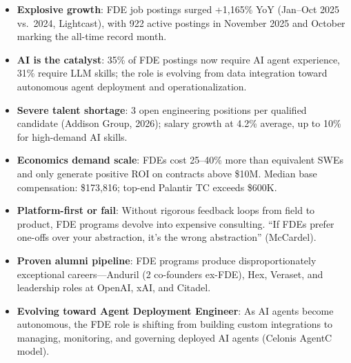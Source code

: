 \begin{tcolorbox}[
    colback=mslightgray, colframe=msblue,
    boxrule=1pt, arc=3pt,
    left=8pt, right=8pt, top=6pt, bottom=6pt,
    title={\textbf{Key Takeaways}}
]
\begin{itemize}
    \item \textbf{Explosive growth}: FDE job postings surged +1,165\%
        YoY (Jan--Oct 2025 vs.\ 2024, Lightcast), with 922 active
        postings in November 2025 and October marking the all-time
        record month.

    \item \textbf{AI is the catalyst}: 35\% of FDE postings now require
        AI agent experience, 31\% require LLM skills; the role is
        evolving from data integration toward autonomous agent deployment
        and operationalization.

    \item \textbf{Severe talent shortage}: 3 open engineering positions
        per qualified candidate (Addison Group, 2026); salary growth at
        4.2\% average, up to 10\% for high-demand AI skills.

    \item \textbf{Economics demand scale}: FDEs cost 25--40\% more than
        equivalent SWEs and only generate positive ROI on contracts above
        \$10M. Median base compensation: \$173,816; top-end Palantir TC
        exceeds \$600K.

    \item \textbf{Platform-first or fail}: Without rigorous feedback
        loops from field to product, FDE programs devolve into expensive
        consulting. ``If FDEs prefer one-offs over your abstraction,
        it's the wrong abstraction'' (McCardel).

    \item \textbf{Proven alumni pipeline}: FDE programs produce
        disproportionately exceptional careers---Anduril (2 co-founders
        ex-FDE), Hex, Veraset, and leadership roles at OpenAI, xAI,
        and Citadel.

    \item \textbf{Evolving toward Agent Deployment Engineer}: As AI
        agents become autonomous, the FDE role is shifting from
        building custom integrations to managing, monitoring, and
        governing deployed AI agents (Celonis AgentC model).
\end{itemize}
\end{tcolorbox}

\vspace{8pt}

